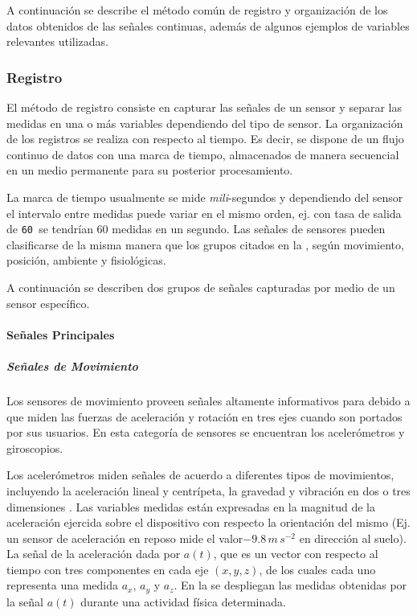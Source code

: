 A continuación se describe el método común de registro y organización
de los datos obtenidos de las señales continuas, además de algunos
ejemplos de variables relevantes utilizadas.

\subsubsection{Registro}

El método de registro consiste en capturar las señales de un sensor
y separar las medidas en una o más variables dependiendo del tipo
de sensor. La organización de los registros se realiza con respecto
al tiempo. Es decir, se dispone de un flujo continuo de datos con
una marca de tiempo, almacenados de manera secuencial en un medio
permanente para su posterior procesamiento. 

La marca de tiempo usualmente se mide \emph{mili}-segundos y dependiendo
del sensor el intervalo entre medidas puede variar en el mismo orden,
ej. con tasa de salida de \texttt{60  }se tendrían 60 medidas
en un segundo. Las señales de sensores pueden clasificarse de la misma
manera que los grupos citados en la , según
movimiento, posición, ambiente y fisiológicas. 

A continuación se describen dos grupos de señales capturadas por medio
de un sensor específico.

\paragraph{Señales Principales}

\subparagraph{Señales de Movimiento}

Los sensores de movimiento proveen señales altamente informativos
para  debido a que miden las fuerzas de aceleración y rotación
en tres ejes cuando son portados por sus usuarios. En esta categoría
de sensores se encuentran los acelerómetros y giroscopios. 

Los acelerómetros miden señales de acuerdo a diferentes tipos de movimientos,
incluyendo la aceleración lineal y centrípeta, la gravedad y vibración
en dos o tres dimensiones \cite{Goehl2007}. Las variables medidas
están expresadas en la magnitud de la aceleración ejercida sobre el
dispositivo con respecto la orientación del mismo (Ej. un sensor de
aceleración en reposo mide el valor$-9.8\,m\,s^{-2}$ en dirección
al suelo). La señal de la aceleración dada por $a(t)$, que es un
vector con respecto al tiempo con tres componentes en cada eje $(x,y,z)$,
de los cuales cada uno representa una medida $a_{x}$, $a_{y}$ y
$a_{z}$. En la  se despliegan las medidas
obtenidas por la señal $a(t)$ durante una actividad física determinada.

